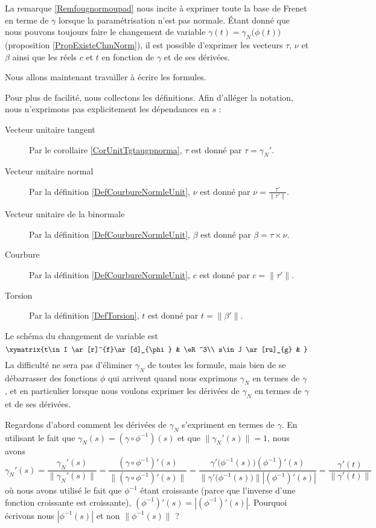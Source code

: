 La remarque \ref{Remfougnormoupad} nous incite à exprimer toute la base de Frenet en terme de $\gamma$ lorsque la paramétrisation n'est pas normale. Étant donné que nous pouvons toujours faire le changement de variable $\gamma(t)=\gamma_N\big( \phi(t) \big)$ (proposition \ref{PropExisteChmNorm}), il est possible d'exprimer les vecteurs $\tau$, $\nu$ et $\beta$ ainsi que les réels $c$ et $t$ en fonction de $\gamma$ et de ses dérivées. 

Nous allons maintenant travailler à écrire les formules. 

Pour plus de facilité, nous collectons les définitions. Afin d'alléger la notation, nous n'exprimons pas explicitement les dépendances en $s$ :
\begin{description}
    \item[Vecteur unitaire tangent] 
        Par le corollaire \ref{CorUnitTgtaugpnorma}, $\tau$ est donné par $\tau=\gamma_N'$.
    \item[Vecteur unitaire normal] 
        Par la définition \ref{DefCourbureNormleUnit}, $\nu$ est donné par
        $\nu=\frac{ \tau' }{ \| \tau' \| }$.
    \item[Vecteur unitaire de la binormale] 
        Par la définition \ref{DefCourbureNormleUnit}, $\beta$ est donné par
            $\beta=\tau\times\nu$.
    \item[Courbure] 
        Par la définition \ref{DefCourbureNormleUnit}, $c$ est donné par
            $c=\| \tau' \|$.
    \item[Torsion]
        Par la définition \ref{DefTorsion}, $t$ est donné par
            $t=\| \beta' \|$.
\end{description}


Le schéma du changement de variable est
\begin{equation}        \label{EqDiagIJstgvpR}
    \xymatrix{%
    t\in I \ar[r]^{f}\ar[d]_{\phi}      &   \eR^3\\
    s\in J \ar[ru]_{g}  &   
       }
\end{equation}
La difficulté ne sera pas d'éliminer $\gamma_N$ de toutes les formule, mais bien de se débarrasser des fonctions $\phi$ qui arrivent quand nous exprimons $\gamma_N$ en termes de $\gamma$, et en particulier lorsque nous voulons exprimer les dérivées de $\gamma_N$ en termes de $\gamma$ et de ses dérivées.

Regardons d'abord comment les dérivées de $\gamma_N$ s'expriment en termes de $\gamma$. En utilisant le fait que $\gamma_N(s)=(\gamma\circ\phi^{-1})(s)$ et que $\| \gamma_N'(s) \|=1$, nous avons
\begin{equation}        \label{EqgpNgpnNnr}
    \gamma_N'(s)=\frac{ \gamma_N'(s) }{ \| \gamma_N'(s) \| }
    =\frac{ (\gamma\circ\phi^{-1})'(s) }{ \| (\gamma\circ\phi^{-1})'(s) \| }
    =\frac{ \gamma'\big( \phi^{-1}(s) \big)   (\phi^{-1})'(s)   }{ \| \gamma'\big( \phi^{-1}(s) \big) \|  |(\phi^{-1})'(s) |}
    =\frac{ \gamma'(t) }{ \| \gamma'(t) \| }
\end{equation}
où nous avons utilisé le fait que $\phi^{-1}$ étant croissante (parce que l'inverse d'une fonction croissante est croissante), $(\phi^{-1})'(s)=| (\phi^{-1})'(s) |$. Pourquoi écrivons nous $| \phi^{-1}(s) |$ et non $\| \phi^{-1}(s) \|$ ?


